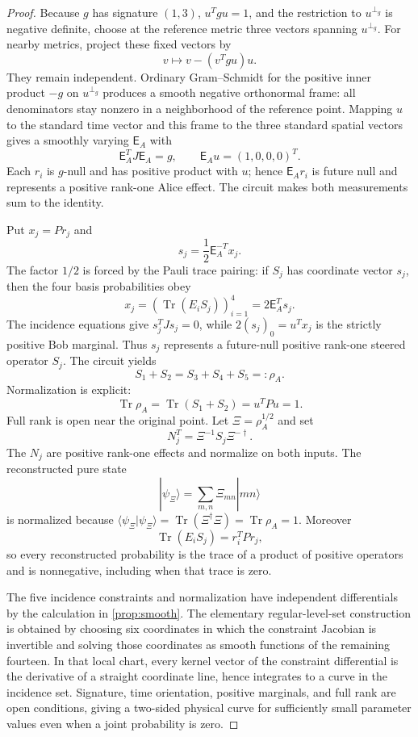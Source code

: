 \documentclass[11pt]{article}
\theoremstyle{definition}
\newcommand{\Tr}{\operatorname{Tr}}
\begin{document}
\begin{proof}
Because \(g\) has signature \((1,3)\), \(u^Tgu=1\), and the restriction to
\(u^{\perp_g}\) is negative definite, choose at the reference metric three
vectors spanning \(u^{\perp_g}\). For nearby metrics, project these fixed
vectors by
\[
v\longmapsto v-(v^Tgu)u.
\]
They remain independent. Ordinary Gram--Schmidt for the positive inner
product \(-g\) on \(u^{\perp_g}\) produces a smooth negative orthonormal frame:
all denominators stay nonzero in a neighborhood of the reference point.
Mapping \(u\) to the standard time vector and this frame to the three standard
spatial vectors gives a smoothly varying \(\mathsf E_A\) with
\[
\mathsf E_A^TJ\mathsf E_A=g,\qquad
\mathsf E_Au=(1,0,0,0)^T.
\]
Each \(r_i\) is \(g\)-null and has positive product with \(u\); hence
\(\mathsf E_A r_i\) is future null and represents a positive rank-one Alice
effect. The circuit makes both measurements sum to the identity.

Put \(x_j=Pr_j\) and
\[
s_j=\frac12\mathsf E_A^{-T}x_j.
\]
The factor \(1/2\) is forced by the Pauli trace pairing: if \(S_j\) has
coordinate vector \(s_j\), then the four basis probabilities obey
\[
x_j=(\Tr(E_iS_j))_{i=1}^4=2\mathsf E_A^Ts_j.
\]
The incidence equations give \(s_j^TJs_j=0\), while
\(2(s_j)_0=u^Tx_j\) is the strictly positive Bob marginal. Thus \(s_j\)
represents a future-null positive rank-one steered operator \(S_j\).
The circuit yields
\[
S_1+S_2=S_3+S_4+S_5=:\rho_A.
\]
Normalization is explicit:
\[
\Tr\rho_A=\Tr(S_1+S_2)
=u^TPu=1.
\]
Full rank is open near the original point. Let
\(\Xi=\rho_A^{1/2}\) and set
\[
N_j^T=\Xi^{-1}S_j\Xi^{-\dagger}.
\]
The \(N_j\) are positive rank-one effects and normalize on both inputs.
The reconstructed pure state
\[
|\psi_\Xi\rangle=\sum_{m,n}\Xi_{mn}|mn\rangle
\]
is normalized because
\(\langle\psi_\Xi|\psi_\Xi\rangle=\Tr(\Xi^\dagger\Xi)
=\Tr\rho_A=1\).
Moreover
\[
\Tr(E_iS_j)=r_i^TPr_j,
\]
so every reconstructed probability is the trace of a product of positive
operators and is nonnegative, including when that trace is zero.

The five incidence constraints and normalization have independent
differentials by the calculation in \cref{prop:smooth}. The elementary
regular-level-set construction is obtained by choosing six coordinates in
which the constraint Jacobian is invertible and solving those coordinates as
smooth functions of the remaining fourteen. In that local chart, every
kernel vector of the constraint differential is the derivative of a straight
coordinate line, hence integrates to a curve in the incidence set.
Signature, time orientation, positive marginals, and full rank are open
conditions, giving a two-sided physical curve for sufficiently small
parameter values even when a joint probability is zero.
\end{proof}
\end{document}

